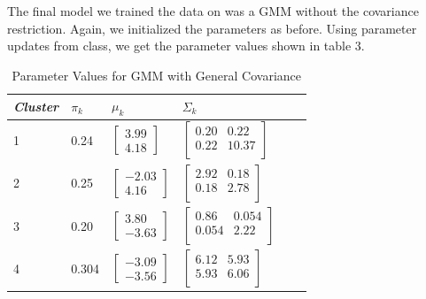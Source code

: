 \documentclass[paper=a4, fontsize=11pt]{scrartcl} %
\numberwithin{equation}{section} %
\numberwithin{figure}{section} %
\numberwithin{table}{section} %
\begin{document}
The final model we trained the data on was a GMM without the covariance restriction. Again, we initialized the parameters as before. Using parameter updates from class, we get the parameter values shown in table 3.

	\begin{table}
		\caption {Parameter Values for GMM with General Covariance} \label{tab:title} 
		\begin{center}		
			\begin{tabular}{*6l}   
				\toprule
				\emph{Cluster}&  $\pi_k$ & $\mu_k$ & $\Sigma_k$\\\midrule
				1 & 0.24
				& $\begin{bmatrix} 3.99 \\ 4.18\end{bmatrix}$  
				& $\begin{bmatrix}
				0.20 & 0.22 \\
				0.22 & 10.37 \\ \end{bmatrix}$\\
				2 & 0.25 
				& $\begin{bmatrix}-2.03 \\ 4.16\end{bmatrix}$ 
				& $\begin{bmatrix}
				2.92 & 0.18 \\
				0.18 & 2.78 \\ \end{bmatrix}$\\
				3 & 0.20
				& $\begin{bmatrix}3.80 \\ -3.63\end{bmatrix}$ 
				& $\begin{bmatrix}
				0.86 & 0.054 \\
				0.054 &  2.22 \\ \end{bmatrix}$\\	
				4 & 0.304
				& $\begin{bmatrix}-3.09 \\-3.56 \end{bmatrix}$ 
				& $\begin{bmatrix}
				6.12 & 5.93 \\
				5.93 &  6.06 \\ \end{bmatrix}$	
				\\\bottomrule
				\hline
			\end{tabular}
		\end{center}
	\end{table}
\end{document}
